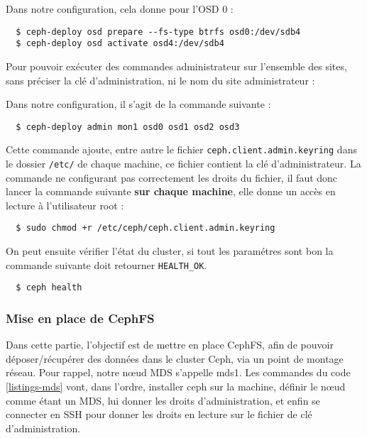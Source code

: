 Dans notre configuration, cela donne pour l'OSD 0 :

\vspace{3mm}
\begin{lstlisting}
  $ ceph-deploy osd prepare --fs-type btrfs osd0:/dev/sdb4
  $ ceph-deploy osd activate osd4:/dev/sdb4
\end{lstlisting}

Pour pouvoir exécuter des commandes administrateur sur l'ensemble des sites, sans préciser la clé d'administration, ni le nom du site administrateur :

Dans notre configuration, il s'agit de la commande suivante :
\vspace{3mm}
\begin{lstlisting}
  $ ceph-deploy admin mon1 osd0 osd1 osd2 osd3
\end{lstlisting}
  
  Cette commande ajoute, entre autre le fichier \verb|ceph.client.admin.keyring| dans le dossier \verb|/etc/| de chaque machine, ce fichier contient la clé d'administrateur. La commande ne configurant pas correctement les droits du fichier, il faut donc lancer la commande suivante \textbf{sur chaque machine}, elle donne un accès en lecture à l'utilisateur root :

\vspace{3mm}
\begin{lstlisting}
  $ sudo chmod +r /etc/ceph/ceph.client.admin.keyring
\end{lstlisting}
  
On peut ensuite vérifier l'état du cluster, si tout les paramétres sont bon la commande suivante doit retourner \verb|HEALTH_OK|.
\vspace{3mm}
\begin{lstlisting}
  $ ceph health
\end{lstlisting}

\subsubsection{Mise en place de CephFS}

Dans cette partie, l'objectif est de mettre en place CephFS, afin de pouvoir déposer/récupérer des données dans le cluster Ceph, via un point de montage réseau.
Pour rappel, notre nœud MDS s’appelle mds1. Les commandes du code \ref{listings-mds} vont, dans l'ordre, installer ceph sur la machine, définir le nœud comme étant un MDS, lui donner les droits d'administration, et enfin se connecter en SSH pour donner les droits en lecture sur le fichier de clé d'administration.

